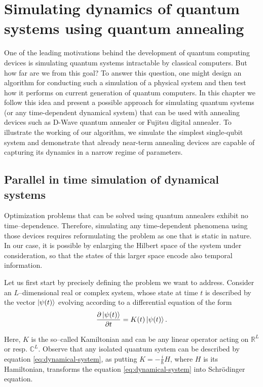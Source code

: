 \chapter{Simulating dynamics of quantum systems using quantum annealing}
\label{chapter:simulating}

One of the leading motivations behind the development of quantum computing devices is simulating quantum systems intractable by classical computers. But how far are we from this goal? To answer this question, one might design an algorithm for conducting such a simulation of a physical system and then test how it performs on current generation of quantum computers. In this chapter we follow this idea and present a possible approach for simulating quantum systems (or any time-dependent dynamical system) that can be used with annealing devices such as D-Wave quantum annealer or Fujitsu digital annealer. To illustrate the working of our algorithm, we simulate the simplest single-qubit system and demonstrate that already near-term annealing devices are capable of capturing its dynamics in a narrow regime of parameters.

\section{Parallel in time simulation of dynamical systems}
Optimization problems that can be solved using quantum annealers exhibit no time--dependence. Therefore, simulating any time-dependent phenomena using those devices requires reformulating the problem as one that is static in nature. In our case, it is possible by enlarging the Hilbert space of the system under consideration, so that the states of this larger space encode also temporal information.

Let us first start by precisely defining the problem we want to address.
Consider an $L$--dimensional real or complex system, whose state at time $t$
is described by the vector $\ket{\psi(t)}$  evolving according to a differential equation of
the form
\begin{equation}
\label{eq:dynamical-system}
    \frac{\partial \ket{\psi(t)}}{\partial t} = K(t) \ket{\psi(t)}.
\end{equation}

Here, $K$ is the so--called Kamiltonian and can be any linear operator acting on $\mathbb{R}^L$ or
resp. $\mathbb{C}^L$. Observe that any isolated quantum system can be described by equation
\eqref{eq:dynamical-system}, as putting $K=-\frac{i}{\hbar}H$, where $H$ is its Hamiltonian,
transforms the equation \eqref{eq:dynamical-system} into Schr\"{o}dinger equation.

